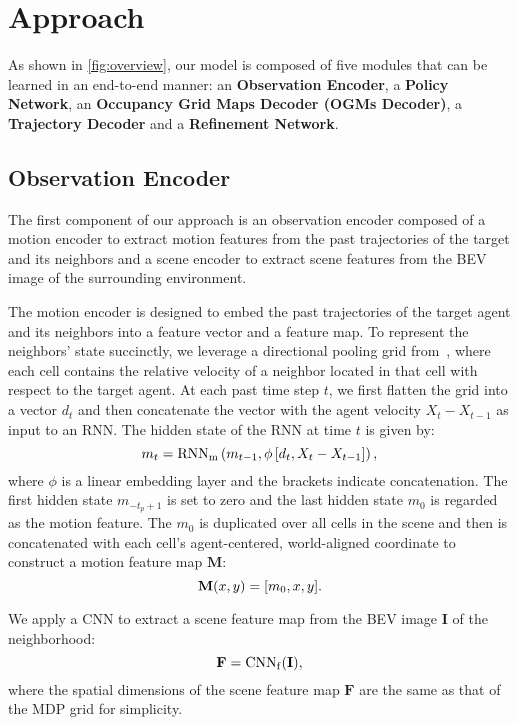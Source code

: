\documentclass[10pt,twocolumn,letterpaper]{article}
\begin{document}
\section{Approach}
\label{sec:approach}
As shown in \cref{fig:overview}, our model is composed of five modules that can be learned in an end-to-end manner: an \textbf{Observation Encoder}, a \textbf{Policy Network}, an \textbf{Occupancy Grid Maps Decoder (OGMs Decoder)}, a \textbf{Trajectory Decoder} and a \textbf{Refinement Network}.



\subsection{Observation Encoder}

The first component of our approach is an observation encoder composed of a motion encoder to extract motion features from the past trajectories of the target and its neighbors and a scene encoder to extract scene features from the BEV image of the surrounding environment. 

 The motion encoder is designed to embed the past trajectories of the target agent and its neighbors into a feature vector and a feature map. To represent the neighbors' state succinctly, we leverage a directional pooling grid from~\cite{kothari2021human}, where each cell contains the relative velocity of a neighbor located in that cell with respect to the target agent. At each past time step $t$, we first flatten the grid into a vector $d_t$ and then concatenate the vector with the agent velocity $X_t-X_{t-1}$ as input to an RNN. The hidden state of the RNN at time $t$ is given by:
\begin{equation}
m_{t} =\operatorname{RNN_m}\left(m_{t-1}, \phi \left[d_{t},X_t-X_{t-1}\right]\right), \notag
\end{equation}
where $\phi$ is a linear embedding layer and the brackets indicate concatenation. The first hidden state $m_{-t_p+1}$ is set to zero and the last hidden state ${m_0}$ is regarded as the motion feature. The $m_0$ is duplicated over all cells in the scene and then is concatenated with each cell's agent-centered, world-aligned coordinate to construct a motion feature map  $\mathbf{M}$:
\begin{equation}
\mathbf{M}(x,y) =[m_0,x,y]. \notag
\end{equation}

 We apply a CNN to extract a scene feature map from the BEV image $\mathbf{I}$ of the neighborhood:
\begin{equation}
\mathbf{F}=\operatorname{CNN_f}(\mathbf{I}), \notag
\end{equation}
where the spatial dimensions of the scene feature map $\mathbf{F}$ are the same as that of the MDP grid for simplicity. 
\end{document}
